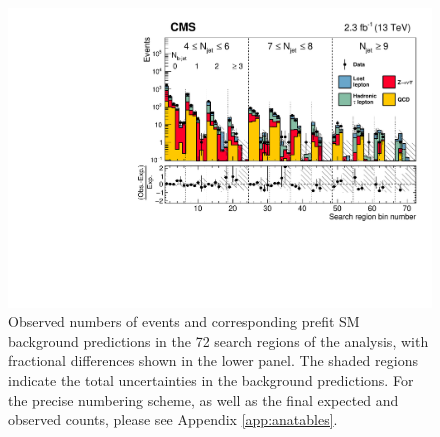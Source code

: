 \begin{figure}[tb!]
\centering
\includegraphics[width=\linewidth]{figures/SusySearches/Ra2b2015/results-plot-prefit.pdf}
\caption{
  Observed numbers of events and corresponding prefit
  SM background predictions
  in the 72 search regions of the analysis,
  with fractional differences shown in the lower panel.
  The shaded regions indicate the total uncertainties in the background
  predictions. For the precise numbering scheme, as well as the final expected and observed counts, please see Appendix \ref{app:anatables}.
}
\label{fig:fit-results}
\end{figure}


